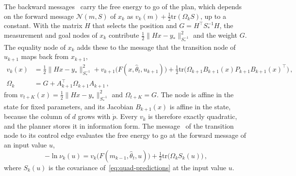 \documentclass{l4dc2027}
\newcommand*\wcircled[1]{\tikz[baseline=(char.base)]{\node[shape=circle,draw,minimum size=4mm,inner sep=0pt] (char) {#1};}}
\def\cN{\mathcal{N}}
\def\tr{\text{tr}}
\begin{document}
The backward messages~\wcircled{6} carry the free energy to go of the plan, which depends on the forward message $\cN(m, S)$ of $x_k$ as $v_k(m) + \tfrac{1}{2}\tr(\Omega_k S)$, up to a constant. With the matrix $H$ that selects the position and $G = H^\top S_*^{-1} H$, the measurement and goal nodes of $x_k$ contribute $\tfrac{1}{2}\|Hx - y_*\|^2_{S_*^{-1}}$ and the weight $G$. The equality node of $x_k$ adds these to the message that the transition node of $u_{k+1}$ maps back from $x_{k+1}$,
\begin{align}
	v_k(x) &= \tfrac{1}{2}\|Hx - y_*\|^2_{S_*^{-1}} + v_{k+1}\big(F(x, \hat\theta_t, u_{k+1})\big) + \tfrac{1}{2}\tr\big(\Omega_{k+1} B_{k+1}(x) P_{k+1} B_{k+1}(x)^\top\big) \, , \label{eq:quad-backward} \\
	\Omega_k &= G + A_{k+1}^\top \Omega_{k+1} A_{k+1} \, , \nonumber
\end{align}
from $v_{t+K}(x) = \tfrac{1}{2}\|Hx - y_*\|^2_{S_*^{-1}}$ and $\Omega_{t+K} = G$. The node is affine in the state for fixed parameters, and its Jacobian $B_{k+1}(x)$ is affine in the state, because the column of $d$ grows with $\dot p$. Every $v_k$ is therefore exactly quadratic, and the planner stores it in information form. The message~\wcircled{2} of the transition node to its control edge evaluates the free energy to go at the forward message of an input value $u$,
\begin{equation}\label{eq:quad-edge}
	-\ln \nu_k(u) = v_k\big(F(m_{k-1}, \hat\theta_t, u)\big) + \tfrac{1}{2}\tr\big(\Omega_k S_k(u)\big) \, ,
\end{equation}
where $S_k(u)$ is the covariance of~\eqref{eq:quad-predictions} at the input value $u$.
\end{document}
